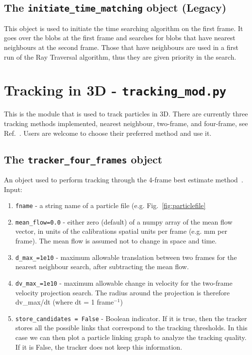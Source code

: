 \documentclass[10pt,a4paper]{article}
\begin{document}
\subsection{The \texttt{initiate\_time\_matching} object  (Legacy)}

This object is used to initiate the time searching algorithm on the first frame. It goes over the blobs at the first frame and searches for blobs that have nearest neighbours at the second frame. Those that have neighbours are used in a first run of the Ray Traversal algorithm, thus they are given priority in the search.













\section{Tracking in 3D - \texttt{tracking\_mod.py}}

This is the module that is used to track particles in 3D. There are currently three tracking methods implemented, nearest neighbour, two-frame, and four-frame, see Ref.~\cite{Ouellette2006}. Users are welcome to choose their preferred method and use it.



\subsection{The \texttt{tracker\_four\_frames} object}\label{sec:four_frames}

An object used to perform tracking through the 4-frame best estimate method~\cite{Ouellette2006}. Input:
%
\begin{enumerate}
	\item \texttt{fname} - a string name of a particle file (e.g. Fig.~\ref{fig:particlefile}
	\item \texttt{mean\_flow=0.0} - either zero (default) of a numpy array of the mean flow vector, in units of the calibrations spatial units per frame (e.g. mm per frame). The mean flow is assumed not to change in space and time.
	\item \texttt{d\_max\_=1e10} - maximum allowable translation between two frames for the nearest neighbour search, after subtracting the mean flow. 
	\item \texttt{dv\_max\_=1e10} - maximum allowable change in velocity for the two-frame velocity projection search. The radius around the projection is therefore dv\_max/dt (where dt = 1 frame$^{-1}$)
	\item \texttt{store\_candidates = False} - Boolean indicator. If it is true, then the tracker stores all the possible links that correspond to the tracking thresholds. In this case we can then plot a particle linking graph to analyze the tracking quality. If it is False, the tracker does not keep this information.  
\end{enumerate}
\end{document}
